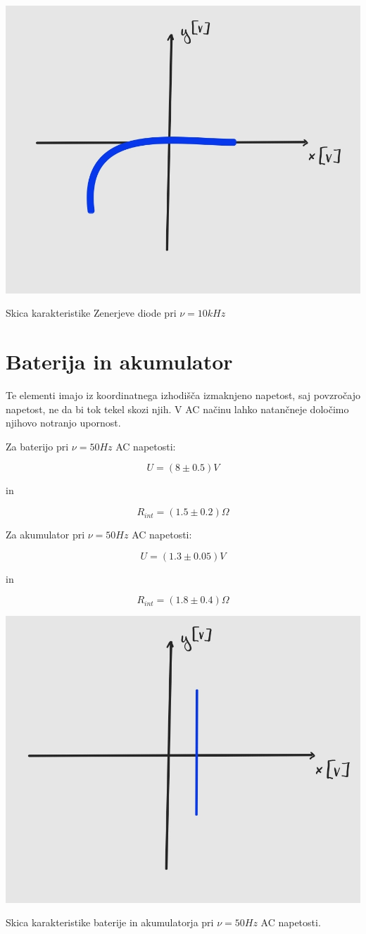 \documentclass[12pt]{report}
\begin{document}
\begin{slika}[H]
  \centering
  \includegraphics{dioda}
  \caption{\small Skica karakteristike Zenerjeve diode pri $\nu = 10\si{kHz}$}
\end{slika}

\section*{Baterija in akumulator}

Te elementi imajo iz koordinatnega izhodišča izmaknjeno napetost, saj povzročajo napetost, ne da bi tok tekel skozi njih. V AC načinu lahko natančneje določimo njihovo notranjo upornost.

Za baterijo pri $\nu = 50\si{Hz}$ AC napetosti: 

\[
  U = (8 \pm 0.5)\si{V}  
\]

in 

\[
  R_{int} = (1.5 \pm 0.2)\Omega  
\]

Za akumulator pri $\nu = 50 \si{Hz}$ AC napetosti: 

\[
  U = (1.3 \pm 0.05)\si{V}  
\]

in 

\[
  R_{int} = (1.8 \pm 0.4)\Omega  
\]


\begin{slika}[H]
  \centering
  \includegraphics{baterija}
  \caption{\small Skica karakteristike baterije in akumulatorja pri $\nu = 50\si{Hz}$ AC napetosti.}
\end{slika}
\end{document}
